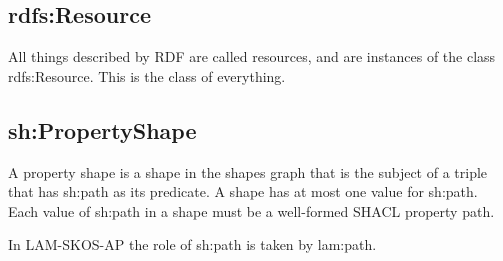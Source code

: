 \subsection{rdfs:Resource}

All things described by RDF are called resources, and are instances of
the class rdfs:Resource. This is the class of everything.

\subsection{sh:PropertyShape}

A property shape is a shape in the shapes graph that is the subject of a
triple that has sh:path as its predicate. A shape has at most one value
for sh:path. Each value of sh:path in a shape must be a well-formed
SHACL property path. 

In LAM-SKOS-AP the role of sh:path is taken by lam:path.

